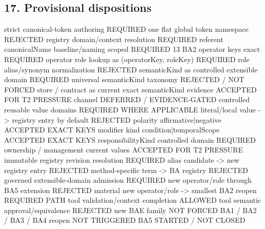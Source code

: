 \documentclass[
  10pt,
  a4paper,
]{article}
\newenvironment{Shaded}{}{}
\newcommand{\NormalTok}[1]{#1}
\begin{document}
\subsection{17. Provisional
dispositions}\label{provisional-dispositions}

\begin{Shaded}
\begin{Highlighting}[]
\NormalTok{strict canonical{-}token authoring                         REQUIRED}
\NormalTok{one flat global token namespace                          REJECTED}
\NormalTok{registry domain/context resolution                       REQUIRED}
\NormalTok{referent canonicalName baseline/naming scoped            REQUIRED}
\NormalTok{13 BA2 operator keys exact                               REQUIRED}
\NormalTok{operator role lookup as (operatorKey, roleKey)           REQUIRED}
\NormalTok{role alias/synonym normalization                          REJECTED}
\NormalTok{semanticKind as controlled extensible domain              REQUIRED}
\NormalTok{universal semanticKind taxonomy                           REJECTED / NOT FORCED}
\NormalTok{store / contract as current exact semanticKind evidence  ACCEPTED FOR T2 PRESSURE}
\NormalTok{channel                                                   DEFERRED / EVIDENCE{-}GATED}
\NormalTok{controlled reusable value domains                         REQUIRED WHERE APPLICABLE}
\NormalTok{literal/local value {-}\textgreater{} registry entry by default          REJECTED}
\NormalTok{polarity affirmative|negative                             ACCEPTED EXACT KEYS}
\NormalTok{modifier kind condition|temporalScope                     ACCEPTED EXACT KEYS}
\NormalTok{responsibilityKind controlled domain                      REQUIRED}
\NormalTok{ownership / management current values                     ACCEPTED FOR T2 PRESSURE}
\NormalTok{immutable registry revision resolution                    REQUIRED}
\NormalTok{alias candidate {-}\textgreater{} new registry entry                     REJECTED}
\NormalTok{method{-}specific term {-}\textgreater{} BA registry                       REJECTED}
\NormalTok{governed extensible{-}domain admission                      REQUIRED}
\NormalTok{new operator/role through BA5 extension                   REJECTED}
\NormalTok{material new operator/role {-}\textgreater{} smallest BA2 reopen         REQUIRED PATH}
\NormalTok{tool validation/context completion                        ALLOWED}
\NormalTok{tool semantic approval/equivalence                        REJECTED}
\NormalTok{new BAE family                                             NOT FORCED}
\NormalTok{BA1 / BA2 / BA3 / BA4 reopen                              NOT TRIGGERED}
\NormalTok{BA5                                                        STARTED / NOT CLOSED}
\end{Highlighting}
\end{Shaded}
\end{document}
